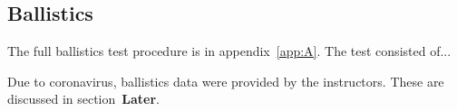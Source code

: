 ﻿\subsection{Ballistics}

The full ballistics test procedure is in appendix~\ref{app:A}. The test consisted of...

Due to coronavirus, ballistics data were provided by the instructors. These are discussed in section~\textbf{Later}.

